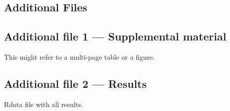 \documentclass{bmcart}
\begin{document}
\begin{backmatter}

\section*{Additional Files}
  \subsection*{Additional file 1 --- Supplemental material}
   This might refer to a multi-page table or a figure.

  \subsection*{Additional file 2 --- Results}
 Rdata file with all results.


\end{backmatter}
\end{document}

